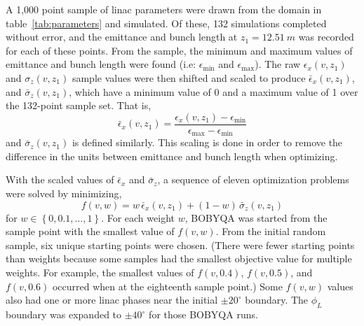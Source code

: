 A 1,000 point sample of linac parameters were drawn from the domain
in table~\ref{tab:parameters} and simulated. Of these, 132 simulations completed
without error, and the emittance and bunch length at $z_1=\SI{12.51}{m}$ was
recorded for each of these points. From the sample, the minimum and maximum values of emittance and bunch length
were found (i.e: $\epsilon_{\min}$ and $\epsilon_{\max}$). 
The raw $\epsilon_x(v,z_1)$ and $\sigma_z(v,z_1)$ sample values were then
shifted and scaled to produce $\bar{\epsilon}_x(v,z_1)$, and $\bar{\sigma}_z(v,z_1)$,
which have a minimum value of 0 and a maximum value of 1 over the 132-point sample set. That is, 
\begin{equation}
\bar{\epsilon}_x (v,z_1) = \frac{ \epsilon_x (v,z_1) - \epsilon_{\min} } { \epsilon_{\max} - \epsilon_{\min} }
\label{eq:scale}
\end{equation} 
and $\bar{\sigma}_z (v,z_1)$ is defined similarly.
This scaling is done in order to remove the difference in the units between
emittance and bunch length when optimizing.

With the scaled values of $\bar{\epsilon}_x$ and $\bar{\sigma}_z$, a sequence
of eleven optimization problems were solved by minimizing,
\begin{equation}
f(v,w) = w \,\bar{\epsilon}_x(v,z_1) + (1-w)\, \bar{\sigma}_z(v,z_1)
\label{eq:newobj}
\end{equation}
for $w \in \left\{ 0, 0.1, \ldots, 1 \right\}$. 
For each weight $w$, BOBYQA was started from the sample point with the 
smallest value of $f(v,w)$.  From the initial random sample, six unique starting points were chosen. 
(There were fewer starting points than weights because some samples had the smallest objective value for multiple weights. 
For example, the smallest values of $f(v,0.4)$, $f(v,0.5)$, and $f(v,0.6)$ occurred when at the eighteenth sample point.)
Some $f(v,w)$ values also had one or more linac phases near the initial $\pm20^{\circ}$ boundary. 
The $\phi_L$ boundary was expanded to $\pm40^{\circ}$ for those BOBYQA runs.

